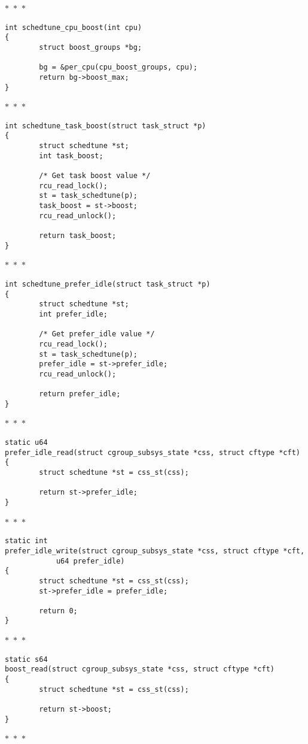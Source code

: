 \documentclass{article}
\newcommand{\divider}{{\begin{center}
  $\ast$~$\ast$~$\ast$
\end{center}}}
\begin{document}
\divider
\begin{verbatim}
int schedtune_cpu_boost(int cpu)
{
        struct boost_groups *bg;

        bg = &per_cpu(cpu_boost_groups, cpu);
        return bg->boost_max;
}
\end{verbatim}
\divider
\begin{verbatim}
int schedtune_task_boost(struct task_struct *p)
{
        struct schedtune *st;
        int task_boost;

        /* Get task boost value */
        rcu_read_lock();
        st = task_schedtune(p);
        task_boost = st->boost;
        rcu_read_unlock();

        return task_boost;
}
\end{verbatim}
\divider
\begin{verbatim}
int schedtune_prefer_idle(struct task_struct *p)
{
        struct schedtune *st;
        int prefer_idle;

        /* Get prefer_idle value */
        rcu_read_lock();
        st = task_schedtune(p);
        prefer_idle = st->prefer_idle;
        rcu_read_unlock();

        return prefer_idle;
}
\end{verbatim}
\divider
\begin{verbatim}
static u64
prefer_idle_read(struct cgroup_subsys_state *css, struct cftype *cft)
{
        struct schedtune *st = css_st(css);

        return st->prefer_idle;
}
\end{verbatim}
\divider
\begin{verbatim}
static int
prefer_idle_write(struct cgroup_subsys_state *css, struct cftype *cft,
            u64 prefer_idle)
{
        struct schedtune *st = css_st(css);
        st->prefer_idle = prefer_idle;

        return 0;
}
\end{verbatim}
\divider
\begin{verbatim}
static s64
boost_read(struct cgroup_subsys_state *css, struct cftype *cft)
{
        struct schedtune *st = css_st(css);

        return st->boost;
}
\end{verbatim}
\divider
\end{document}
